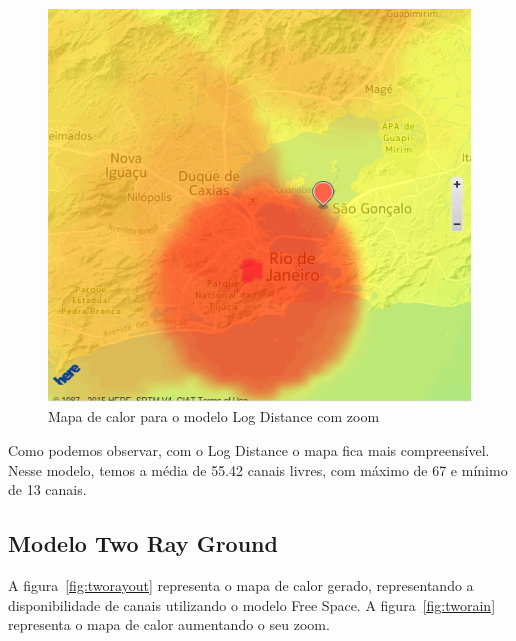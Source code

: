 \begin{figure}[htb]
\centering
\includegraphics[width=1.0\textwidth]{figs/logdistancein}
\caption[Mapa de calor para o modelo Log Distance com zoom]
{Mapa de calor para o modelo Log Distance com zoom}
\label{fig:logdistancein}
\end{figure} 

\FloatBarrier

Como podemos observar, com o Log Distance o mapa fica mais compreensível. Nesse modelo, temos a média de 55.42 canais livres, com máximo de 67 e mínimo de 13 canais.

\subsection{Modelo Two Ray Ground}

A figura~\ref{fig:tworayout} representa o mapa de calor gerado, representando a disponibilidade de canais utilizando o modelo Free Space. A figura~\ref{fig:tworain} representa o mapa de calor aumentando o seu zoom.

